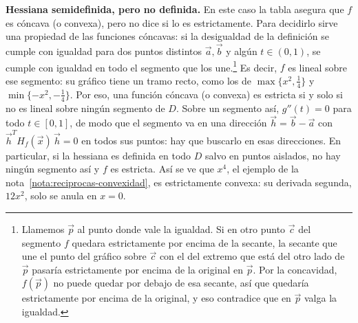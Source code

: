 \documentclass{article}
\newcommand{\vect}[1]{\vec{#1}}
\begin{document}
\medskip
\noindent\textbf{Hessiana semidefinida, pero no definida.} En este caso la tabla asegura que \(f\) es cóncava (o convexa), pero no dice si lo es estrictamente. Para decidirlo sirve una propiedad de las funciones cóncavas: si la desigualdad de la definición se cumple con igualdad para dos puntos distintos \(\vect{a},\vect{b}\) y algún \(t\in(0,1)\), se cumple con igualdad en todo el segmento que los une.\footnote{Llamemos \(\vect{p}\) al punto donde vale la igualdad. Si en otro punto \(\vect{c}\) del segmento \(f\) quedara estrictamente por encima de la secante, la secante que une el punto del gráfico sobre \(\vect{c}\) con el del extremo que está del otro lado de \(\vect{p}\) pasaría estrictamente por encima de la original en \(\vect{p}\). Por la concavidad, \(f(\vect{p})\) no puede quedar por debajo de esa secante, así que quedaría estrictamente por encima de la original, y eso contradice que en \(\vect{p}\) valga la igualdad.} Es decir, \(f\) es lineal sobre ese segmento: su gráfico tiene un tramo recto, como los de \(\max\{x^2,\tfrac14\}\) y \(\min\{-x^2,-\tfrac14\}\). Por eso, una función cóncava (o convexa) es estricta si y solo si no es lineal sobre ningún segmento de \(D\). Sobre un segmento así, \(g''(t)=0\) para todo \(t\in[0,1]\), de modo que el segmento va en una dirección \(\vect{h}=\vect{b}-\vect{a}\) con \(\vect{h}^{T}H_f(\vect{x})\,\vect{h}=0\) en todos sus puntos: hay que buscarlo en esas direcciones. En particular, si la hessiana es definida en todo \(D\) salvo en puntos aislados, no hay ningún segmento así y \(f\) es estricta. Así se ve que \(x^4\), el ejemplo de la nota~\ref{nota:reciprocas-convexidad}, es estrictamente convexa: su derivada segunda, \(12x^2\), solo se anula en \(x=0\).
\end{document}
